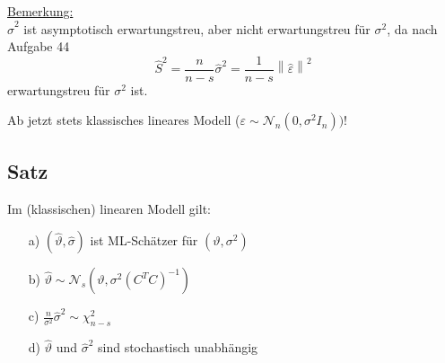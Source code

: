 \documentclass[a4paper,11pt,twoside,titlepage]{article}
\newcommand\NN{ \mathcal{N} } %
\begin{document}
\underline{Bemerkung:}\\
$\hat\sigma^2$ ist asymptotisch erwartungstreu, aber nicht erwartungstreu für $\sigma^2$, da nach Aufgabe 44
$$\hat{S}^2=\frac{n}{n-s}\hat\sigma^2=\frac{1}{n-s}\left\|\hat\varepsilon\right\|^2$$ erwartungstreu für $\sigma^2$ ist.

\vspace{2cm}

Ab jetzt stets klassisches lineares Modell ($\varepsilon\sim\NN_n(0,\sigma^2I_n))$!

\subsection{Satz}
Im (klassischen) linearen Modell gilt:
\begin{itemize}
\item[a) ]$(\hat\vartheta,\hat\sigma)$ ist ML-Schätzer für $(\vartheta,\sigma^2)$
\item[b) ]$\hat\vartheta\sim\NN_s(\vartheta,\sigma^2(C^TC)^{-1})$
\item[c) ]$\frac{n}{\sigma^2}\hat\sigma^2\sim\chi^2_{n-s}$
\item[d) ]$\hat\vartheta$ und $\hat\sigma^2$ sind stochastisch unabhängig
\end{itemize}
\end{document}
